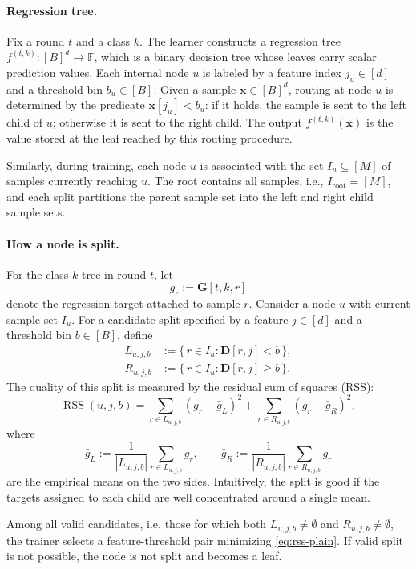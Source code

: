 \paragraph{Regression tree.}
Fix a round $t$ and a class $k$. The learner constructs a regression tree
$f^{(t,k)}:[B]^d\to\mathbb{F}$, which is a binary decision tree whose leaves
carry scalar prediction values. Each internal node $u$ is labeled by a feature
index $j_u\in[d]$ and a threshold bin $b_u\in[B]$. Given a sample
$\mathbf{x}\in[B]^d$, routing at node $u$ is determined by the predicate
$\mathbf{x}[j_u] < b_u$: if it holds, the sample is sent to the left child of
$u$; otherwise it is sent to the right child. The output
$f^{(t,k)}(\mathbf{x})$ is the value stored at the leaf reached by this routing
procedure.

Similarly, during training, each node $u$ is associated with the set
$I_u\subseteq[M]$ of samples currently reaching $u$. The root contains all
samples, i.e., $I_{\mathrm{root}}=[M]$, and each split partitions the parent
sample set into the left and right child sample sets.

\paragraph{How a node is split.}
For the class-$k$ tree in round $t$, let
\[
g_r := \mathbf{G}[t,k,r]
\]
denote the regression target attached to sample $r$. Consider a node $u$ with
current sample set $I_u$. For a candidate split specified by a feature
$j\in[d]$ and a threshold bin $b\in[B]$, define
\begin{align}
L_{u,j,b} &:= \{\, r\in I_u : \mathbf{D}[r,j] < b \,\},\\
R_{u,j,b} &:= \{\, r\in I_u : \mathbf{D}[r,j] \ge b \,\}.
\end{align}
The quality of this split is measured by the residual sum of squares (RSS):
\begin{equation}\label{eq:rss-plain}
\operatorname{RSS}(u,j,b)
=
\sum_{r\in L_{u,j,b}} (g_r-\bar{g}_L)^2
+
\sum_{r\in R_{u,j,b}} (g_r-\bar{g}_R)^2,
\end{equation}
where
\[
\bar{g}_L := \frac{1}{|L_{u,j,b}|}\sum_{r\in L_{u,j,b}} g_r,
\qquad
\bar{g}_R := \frac{1}{|R_{u,j,b}|}\sum_{r\in R_{u,j,b}} g_r
\]
are the empirical means on the two sides. Intuitively, the split is good if the
targets assigned to each child are well concentrated around a single mean.

Among all valid candidates, i.e. those for which both $L_{u,j,b}\neq\emptyset$ and $R_{u,j,b}\neq\emptyset$, the trainer selects a
feature-threshold pair minimizing \eqref{eq:rss-plain}.
If valid split is not possible, the node is not split and becomes a leaf.

